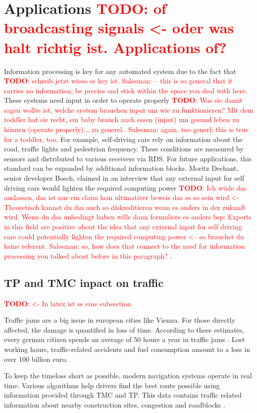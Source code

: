 \documentclass[conference,12pt,a4paper]{IEEEtran}
\newcommand{\todo}[1]{\textcolor{red}{\textbf{TODO}: #1}}
\begin{document}
	\section{Applications \todo{of broadcasting signals <- oder was halt richtig ist. Applications of?}}
	Information processing is key for any automated system due to the fact that \todo{schreib jetzt wieso es key ist. Salesman: – this is so general that it carries no information; be precise and stick within the space you deal with here}. These systems need input in order to operate properly \todo{Was sie damit sagen wollte ist, welche system brauchen input um wie zu funktionieren? Mit dem toddler hat sie recht, ein baby brauch auch essen (input) um gesund leben zu können (operate properly)... zu generel.. Salesman: again, too generl; this is true for a toddler, too}. For example, self-driving cars rely on information about the road, traffic lights and pedestrian frequency. These conditions are measured by sensors and distributed to various receivers via RDS. For future applications, this standard can be expanded by additional information blocks. Moritz Dechant, senior developer Bosch, claimed in an interview that any external input for self driving cars would lighten the required computing  power \cite{bosch} \todo{Ich wüde das auslassen, das ist nur ein claim kein ultimativer beweis das es so sein wird <- Theoretisch kannst du ihn auch so diskreditieren wenn es anders in der zukunft wird. Wenn du das unbedingt haben wills dann formuliere es anders bsp: Experts in this field are positive about the idea that any external input for self driving cars could potentially lighten the required computing  power <-- so brauchst du keine referent. Salesman: so, how does that connect to the need for information processing you talked about before in this paragraph? }.
	
	\subsection{TP and TMC inpact on traffic} \todo{ <- In latex ist es eine subsection}
	
	Traffic jams are a big issue in european cities like Vienna. For those directly affected, the damage is quantified in loss of time. According to these estimates, every german citizen spends an average of 50 hours a year in traffic jams \cite{Stau}. Lost working hours, traffic-related accidents and fuel consumption amount to a loss in over 100 billion euro. 
	
	To keep the timeloss short as possible, modern navigation systems operate in real time. 
	Various algorithms help drivers find the best route possible using information provided through TMC and TP. This data contains traffic related information about nearby construction sites, congestion and roadblocks \cite{uyeki2010route}.
	
\end{document}

